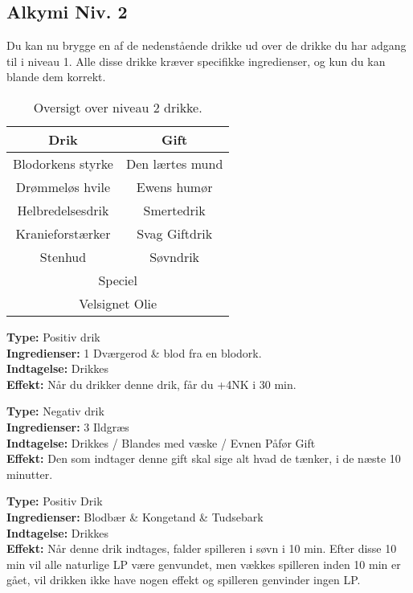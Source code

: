 \subsection*{Alkymi Niv. 2}
Du kan nu brygge en af de nedenstående drikke ud over de drikke du har adgang til i niveau 1. Alle disse drikke kræver specifikke ingredienser, og kun du kan blande dem korrekt.\\

\begin{table}[H]
    \centering
    \begin{tabular}{|c|c|}
        \rowcolor{cerulean!80}\hline
        Drik & Gift \\\hline
        Blodorkens styrke &  Den lærtes mund \\\hline
        Drømmeløs hvile & Ewens humør \\\hline
        Helbredelsesdrik & Smertedrik \\\hline
        Kranieforstærker & Svag Giftdrik\\\hline
        Stenhud &  Søvndrik\\\hline
        \multicolumn{2}{|c|}{Speciel} \\\hline
        \multicolumn{2}{|c|}{Velsignet Olie} \\\hline
    \end{tabular}
    \caption{Oversigt over niveau 2 drikke.}
\end{table}

\begin{drik*}
\textbf{Type:} Positiv drik \\
\textbf{Ingredienser:} 1 Dværgerod \& blod fra en blodork.\\
\textbf{Indtagelse:} Drikkes\\
\textbf{Effekt:} Når du drikker denne drik, får du +4NK i 30 min.
\end{drik*}

\begin{gift*}
\textbf{Type:} Negativ drik\\
\textbf{Ingredienser:} 3 Ildgræs\\
\textbf{Indtagelse:} Drikkes / Blandes med væske / Evnen Påfør Gift\\
\textbf{Effekt:} Den som indtager denne gift skal sige alt hvad de tænker, i de næste 10 minutter.
\end{gift*}

\begin{drik*}
\textbf{Type:} Positiv Drik\\
\textbf{Ingredienser:} Blodbær \& Kongetand \& Tudsebark \\
\textbf{Indtagelse:} Drikkes\\
\textbf{Effekt:} Når denne drik indtages, falder spilleren i søvn i 10 min. Efter disse 10 min vil alle naturlige LP være genvundet, men vækkes spilleren inden 10 min er gået, vil drikken ikke have nogen effekt og spilleren genvinder ingen LP.\\
\end{drik*}


